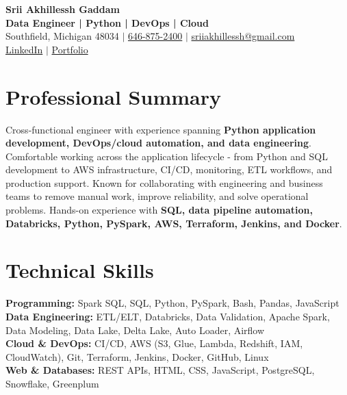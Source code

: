 \documentclass[letterpaper,10pt]{article}
\begin{document}
\fontsize{9.35pt}{10.45pt}\selectfont

\begin{center}
    {\LARGE \textbf{Srii Akhillessh Gaddam}} \\[-1pt]
    \textbf{Data Engineer | Python | DevOps | Cloud} \\[2pt]
    Southfield, Michigan 48034 $|$
    \href{tel:6468752400}{646-875-2400} $|$
    \href{mailto:sriiakhillessh@gmail.com}{sriiakhillessh@gmail.com} \\[1pt]
    \href{https://www.linkedin.com/in/srii-akhiilessh-gaddam-b48668191/}{LinkedIn} $|$
    \href{https://sriiakhillesshg.github.io/portfolio/}{Portfolio}
\end{center}
\vspace{-8pt}

\section{Professional Summary}
\small{Cross-functional engineer with experience spanning \textbf{Python application development, DevOps/cloud automation, and data engineering}. Comfortable working across the application lifecycle - from Python and SQL development to AWS infrastructure, CI/CD, monitoring, ETL workflows, and production support. Known for collaborating with engineering and business teams to remove manual work, improve reliability, and solve operational problems. Hands-on experience with \textbf{SQL, data pipeline automation, Databricks, Python, PySpark, AWS, Terraform, Jenkins, and Docker}.}

\section{Technical Skills}
\small{
\textbf{Programming:} Spark SQL, SQL, Python, PySpark, Bash, Pandas, JavaScript \\
\textbf{Data Engineering:} ETL/ELT, Databricks, Data Validation, Apache Spark, Data Modeling, Data Lake, Delta Lake, Auto Loader, Airflow \\
\textbf{Cloud \& DevOps:} CI/CD, AWS (S3, Glue, Lambda, Redshift, IAM, CloudWatch), Git, Terraform, Jenkins, Docker, GitHub, Linux \\
\textbf{Web \& Databases:} REST APIs, HTML, CSS, JavaScript, PostgreSQL, Snowflake, Greenplum
}
\end{document}
